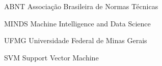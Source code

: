 
\begin{siglas}
  \item[ABNT] Associação Brasileira de Normas Técnicas
  \item[MINDS] Machine Intelligence and Data Science
  \item[UFMG] Universidade Federal de Minas Gerais
  \item[SVM] Support Vector Machine
\end{siglas}